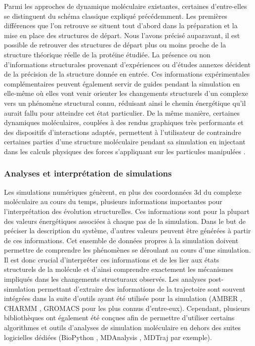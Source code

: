 Parmi les approches de dynamique moléculaire existantes, certaines d'entre-elles se distinguent du schéma classique expliqué précédemment.
Les premières différences que l'on retrouve se situent tout d'abord dans la préparation et la mise en place des structures de départ. Nous l'avons précisé auparavant, il est possible de retrouver des structures de départ plus ou moins proche de la structure théorique réelle de la protéine étudiée. La présence ou non d'informations structurales provenant d'expériences ou d'études annexes décident de la précision de la structure donnée en entrée.
Ces informations expérimentales complémentaires peuvent également servir de guides pendant la simulation en elle-même où elles vont venir orienter les changements structurels d'un complexe vers un phénomène structural connu, réduisant ainsi le chemin énergétique qu'il aurait fallu pour atteindre cet état particulier.
De la même manière, certaines dynamiques moléculaires, couplées à des rendus graphiques très performants et des dispositifs d'interactions adaptés, permettent à l'utilisateur de contraindre certaines parties d'une structure moléculaire pendant sa simulation en injectant dans les calculs physiques des forces s'appliquant sur les particules manipulées \cite{bolopion_comparing_2010}.

\subsubsection{Analyses et interprétation de simulations}

Les simulations numériques génèrent, en plus des coordonnées 3d du complexe moléculaire au cours du temps, plusieurs informations importantes pour l'interprétation des évolution structurelles. Ces informations sont pour la plupart des valeurs énergétiques associées à chaque pas de la simulation. Dans le but de préciser la description du système, d'autres valeurs peuvent être générées à partir de ces informations. Cet ensemble de données propres à la simulation doivent permettre de comprendre les phénomènes se déroulant au cours d'une simulation. Il est donc crucial d'interpréter ces informations et de les lier aux états structurels de la molécule et d'ainsi comprendre exactement les mécanismes impliqués dans les changements structuraux observés. Les analyses post-simulation permettant d'extraire des informations de la trajectoire sont souvent intégrées dans la suite d'outils ayant été utilisée pour la simulation (AMBER \cite{pearlman1995amber}, CHARMM \cite{brooks2009charmm}, GROMACS \cite{pronk2013gromacs} pour les plus connus d'entre-eux). Cependant, plusieurs bibliothèques ont également été conçues afin de permettre d'utiliser certains algorithmes et outils d'analyses de simulation moléculaire en dehors des suites logicielles dédiées (BioPython \cite{cock_biopython:_2009}, MDAnalysis \cite{michaud-agrawal_mdanalysis:_2011}, MDTraj \cite{McGibbon2014MDTraj} par exemple).


